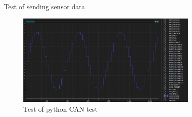 Test of sending sensor data
\begin{figure}[H]
    \center
    \includegraphics[width=0.8\textwidth]{graphics/test_can_spoof_current.png}
    \caption{Test of python CAN test}
    \label{fig:PCB_block}
\end{figure}